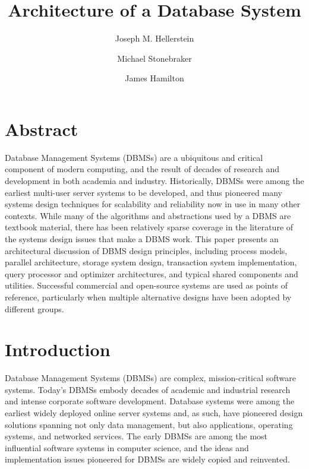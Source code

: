 \documentclass[a4paper,11pt,twoside,openright]{book}
\title{Architecture of a Database System}
\author{Joseph M. Hellerstein}
\affil{University of California, Berkeley, USA, hellerstein@cs.berkeley.edu}
\author{Michael Stonebraker}
\affil{Massachusetts Institute of Technology, USA}
\author{James Hamilton}
\affil{Microsoft Research, USA}
\date{}
\begin{document}
\maketitle
\thispagestyle{empty}

\cleardoublepage{}
\tableofcontents{}

\hypertarget{abstract}{%
\chapter*{Abstract}\label{abstract}}

Database Management Systems (DBMSs) are a ubiquitous and critical
component of modern computing, and the result of decades of research and
development in both academia and industry. Historically, DBMSs were
among the earliest multi-user server systems to be developed, and thus
pioneered many systems design techniques for scalability and reliability
now in use in many other contexts. While many of the algorithms and
abstractions used by a DBMS are textbook material, there has been
relatively sparse coverage in the literature of the systems design
issues that make a DBMS work. This paper presents an architectural
discussion of DBMS design principles, including process models, parallel
architecture, storage system design, transaction system implementation,
query processor and optimizer architectures, and typical shared
components and utilities. Successful commercial and open-source systems
are used as points of reference, particularly when multiple alternative
designs have been adopted by different groups.

\hypertarget{introduction}{%
\chapter{Introduction}\label{introduction}}

Database Management Systems (DBMSs) are complex, mission-critical
software systems. Today's DBMSs embody decades of academic and
industrial research and intense corporate software development. Database
systems were among the earliest widely deployed online server systems
and, as such, have pioneered design solutions spanning not only data
management, but also applications, operating systems, and networked
services. The early DBMSs are among the most influential software
systems in computer science, and the ideas and implementation issues
pioneered for DBMSs are widely copied and reinvented.
\end{document}
